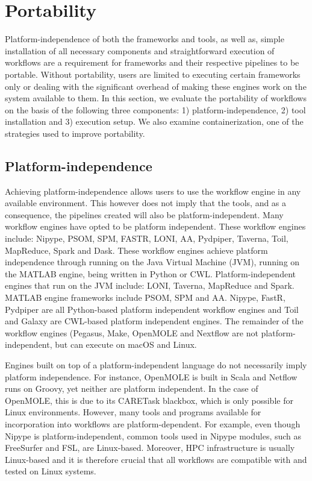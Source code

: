     \section{Portability}\label{portability} Platform-independence of both the
        frameworks and tools, as well as, simple installation of all necessary
        components and straightforward execution of workflows are a requirement
        for frameworks and their respective pipelines to be portable. Without
        portability, users are limited to executing certain frameworks only or
        dealing with the significant overhead of making these engines work on
        the system available to them. In this section, we evaluate the
        portability of workflows on the basis of the following three components:
        1) platform-independence, 2) tool installation and 3) execution setup.
        We also examine containerization, one of the strategies used to improve
        portability.

        \subsection{Platform-independence}
            Achieving platform-independence allows users to use the workflow
            engine in any available environment. This however does not imply
            that the tools, and as a consequence, the pipelines created will
            also be platform-independent. Many workflow engines have opted to be
            platform independent. These workflow engines include: Nipype, PSOM,
            SPM, FASTR, LONI, AA, Pydpiper, Taverna, Toil, MapReduce, Spark and
            Dask. These workflow engines achieve platform independence through
            running on the Java Virtual Machine (JVM), running on the MATLAB
            engine, being written in Python or CWL. Platform-independent engines
            that run on the JVM include: LONI, Taverna, MapReduce and Spark.
            MATLAB engine frameworks include PSOM, SPM and AA. Nipype, FastR,
            Pydpiper are all Python-based platform independent workflow engines
            and Toil and Galaxy are CWL-based platform independent engines. The
            remainder of the workflow engines (Pegasus, Make, OpenMOLE and
            Nextflow are not platform-independent, but can execute on macOS and
            Linux.

            Engines built on top of a platform-independent language do not
            necessarily imply platform independence. For instance, OpenMOLE is
            built in Scala and Netflow runs on Groovy, yet neither are platform
            independent. In the case of OpenMOLE, this is due to its CARETask
            blackbox, which is only possible for Linux environments. However,
            many tools and programs available for incorporation into workflows
            are platform-dependent. For example, even though Nipype is
            platform-independent, common tools used in Nipype modules, such as
            FreeSurfer and FSL, are Linux-based. Moreover, HPC infrastructure is
            usually Linux-based and it is therefore crucial that all workflows
            are compatible with and tested on Linux systems.
             
